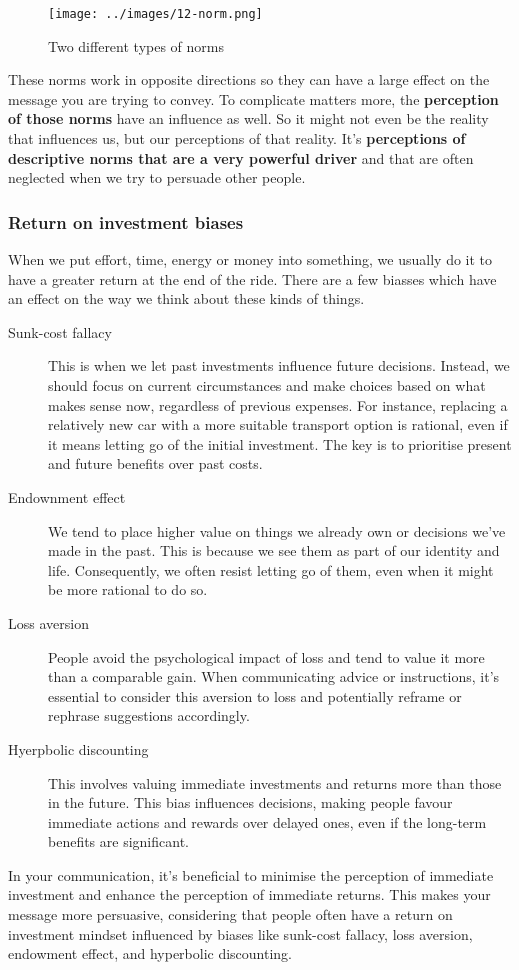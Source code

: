 \documentclass[../summary.tex]{subfiles}
\begin{document}
\begin{figure}[h]
	\centering
	\texttt{[image: ../images/12-norm.png]}
	\caption{Two different types of norms}
	\label{fig:norm}
\end{figure}
These norms work in opposite directions so they can have a large effect on the message you are trying to convey. To complicate matters more, the \textbf{perception of those norms} have an influence as well. So it might not even be the reality that influences us, but our perceptions of that reality. It's \textbf{perceptions of descriptive norms that are a very powerful driver} and that are often neglected when we try to persuade other people.

\subsubsection{Return on investment biases}
When we put effort, time, energy or money into something, we usually do it to have a greater return at the end of the ride. There are a few biasses which have an effect on the way we think about these kinds of things.
\begin{description}
	\item[Sunk-cost fallacy] This is when we let past investments influence future decisions. Instead, we should focus on current circumstances and make choices based on what makes sense now, regardless of previous expenses. For instance, replacing a relatively new car with a more suitable transport option is rational, even if it means letting go of the initial investment. The key is to prioritise present and future benefits over past costs.
	\item[Endownment effect] We tend to place higher value on things we already own or decisions we've made in the past. This is because we see them as part of our identity and life. Consequently, we often resist letting go of them, even when it might be more rational to do so.
	\item[Loss aversion] People avoid the psychological impact of loss and tend to value it more than a comparable gain. When communicating advice or instructions, it's essential to consider this aversion to loss and potentially reframe or rephrase suggestions accordingly.
	\item[Hyerpbolic discounting] This involves valuing immediate investments and returns more than those in the future. This bias influences decisions, making people favour immediate actions and rewards over delayed ones, even if the long-term benefits are significant.
\end{description}
In your communication, it's beneficial to minimise the perception of immediate investment and enhance the perception of immediate returns. This makes your message more persuasive, considering that people often have a return on investment mindset influenced by biases like sunk-cost fallacy, loss aversion, endowment effect, and hyperbolic discounting.
\end{document}
